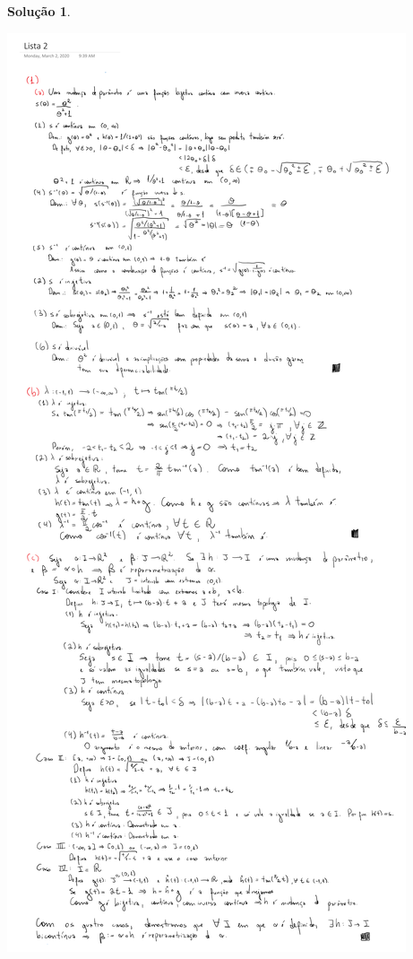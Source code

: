\documentclass[a4paper,12pt]{article}
\theoremstyle{exer}
\theoremstyle{definition}
\newtheorem{solution}{Solução}
\theoremstyle{plain}
\begin{document}
\begin{solution}
\begin{figure}
    \end{figure}
    \clearpage
    \begin{center}
        \includegraphics[width=\textwidth, trim=1.5in 0in 0in 40in, clip]{images/exe4.png}
    \end{center}
    
\end{solution}
\end{document}
